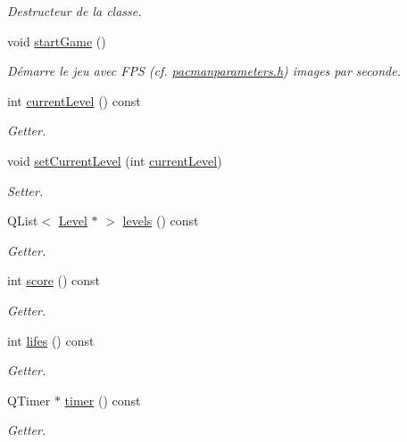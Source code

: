 \begin{DoxyCompactItemize}
\begin{DoxyCompactList}\small\item\em Destructeur de la classe. \end{DoxyCompactList}\item 
void \hyperlink{class_game_ae8638ccdb0ef3bf39a6affa30aa1258f}{start\+Game} ()
\begin{DoxyCompactList}\small\item\em Démarre le jeu avec F\+P\+S (cf. \hyperlink{pacmanparameters_8h_source}{pacmanparameters.\+h}) images par seconde. \end{DoxyCompactList}\item 
int \hyperlink{class_game_aa23771d9b5897ab65aae22f930b6e7a8}{current\+Level} () const 
\begin{DoxyCompactList}\small\item\em Getter. \end{DoxyCompactList}\item 
void \hyperlink{class_game_ad7c1d10b807c0707e4b9f71e975135f4}{set\+Current\+Level} (int \hyperlink{class_game_aa23771d9b5897ab65aae22f930b6e7a8}{current\+Level})
\begin{DoxyCompactList}\small\item\em Setter. \end{DoxyCompactList}\item 
Q\+List$<$ \hyperlink{class_level}{Level} $\ast$ $>$ \hyperlink{class_game_a827328224e2d00cca5534a87b655e3c4}{levels} () const 
\begin{DoxyCompactList}\small\item\em Getter. \end{DoxyCompactList}\item 
int \hyperlink{class_game_acd638924aa59358846e55e78d272a2ec}{score} () const 
\begin{DoxyCompactList}\small\item\em Getter. \end{DoxyCompactList}\item 
int \hyperlink{class_game_a5cf4da142ff72734ee8713b2c37b2b9b}{lifes} () const 
\begin{DoxyCompactList}\small\item\em Getter. \end{DoxyCompactList}\item 
Q\+Timer $\ast$ \hyperlink{class_game_a8c93ee78acb3dc311aaf5b7bae06e70c}{timer} () const 
\begin{DoxyCompactList}\small\item\em Getter. \end{DoxyCompactList}\item 

\end{DoxyCompactItemize}
